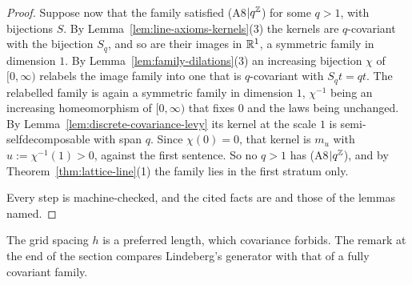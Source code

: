 \begin{proof}
Suppose now that the family satisfied (A8$|q^{\mathbb{Z}}$) for some $q > 1$, with bijections $S$. By
Lemma~\ref{lem:line-axioms-kernels}(3) the kernels are $q$-covariant with the bijection $S_q$, and
so are their images in $\mathbb{R}^1$, a symmetric family in dimension $1$. By
Lemma~\ref{lem:family-dilations}(3) an increasing bijection $\chi$ of $[0,\infty)$ relabels the
image family into one that is $q$-covariant with $S_qt = qt$. The relabelled family is again a
symmetric family in dimension $1$, $\chi^{-1}$ being an increasing homeomorphism of $[0,\infty)$
that fixes $0$ and the laws being unchanged. By
Lemma~\ref{lem:discrete-covariance-levy} its kernel at the scale $1$ is semi-selfdecomposable with
span $q$. Since $\chi(0) = 0$, that kernel is $m_u$ with $u := \chi^{-1}(1) > 0$, against the first
sentence. So no $q > 1$ has (A8$|q^{\mathbb{Z}}$), and by Theorem~\ref{thm:lattice-line}(1) the family lies
in the first stratum only.

Every step is machine-checked, and the cited facts are  and those of the lemmas named.
\end{proof}

The grid spacing $h$ is a preferred length, which covariance forbids. The remark at the end of the
section compares Lindeberg's generator with that of a fully covariant family.

